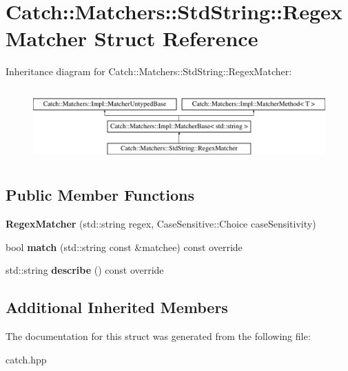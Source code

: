 \hypertarget{struct_catch_1_1_matchers_1_1_std_string_1_1_regex_matcher}{}\section{Catch\+:\+:Matchers\+:\+:Std\+String\+:\+:Regex\+Matcher Struct Reference}
\label{struct_catch_1_1_matchers_1_1_std_string_1_1_regex_matcher}
Inheritance diagram for Catch\+:\+:Matchers\+:\+:Std\+String\+:\+:Regex\+Matcher\+:\begin{figure}[H]
\begin{center}
\leavevmode
\includegraphics[height=2.818792cm]{struct_catch_1_1_matchers_1_1_std_string_1_1_regex_matcher}
\end{center}
\end{figure}
\subsection*{Public Member Functions}
\begin{DoxyCompactItemize}
\item 
\mbox{\label{struct_catch_1_1_matchers_1_1_std_string_1_1_regex_matcher_ab914deb885fe25558c41ab368c6b3916}} 
{\bfseries Regex\+Matcher} (std\+::string regex, Case\+Sensitive\+::\+Choice case\+Sensitivity)
\item 
\mbox{\label{struct_catch_1_1_matchers_1_1_std_string_1_1_regex_matcher_aa8e61adccabb2f36133029301f6b8f4e}} 
bool {\bfseries match} (std\+::string const \&matchee) const override
\item 
\mbox{\label{struct_catch_1_1_matchers_1_1_std_string_1_1_regex_matcher_a1f788cd5258c987e5043f6c7f43adeb9}} 
std\+::string {\bfseries describe} () const override
\end{DoxyCompactItemize}
\subsection*{Additional Inherited Members}


The documentation for this struct was generated from the following file\+:\begin{DoxyCompactItemize}
\item 
catch.\+hpp\end{DoxyCompactItemize}
